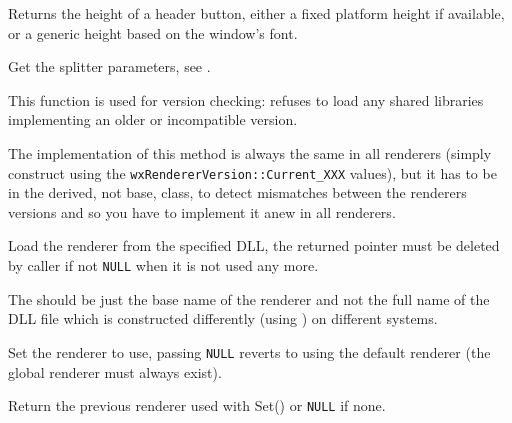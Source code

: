 \label{wxrenderernativegetheaderbuttonheight}


Returns the height of a header button, either a fixed platform height if available, or a 
generic height based on the window's font.


\label{wxrenderernativegetsplitterparams}


Get the splitter parameters, see 
.


\label{wxrenderernativegetversion}


This function is used for version checking:  
refuses to load any shared libraries implementing an older or incompatible
version.

The implementation of this method is always the same in all renderers (simply
construct  using the 
{\tt wxRendererVersion::Current\_XXX} values), but it has to be in the derived,
not base, class, to detect mismatches between the renderers versions and so you
have to implement it anew in all renderers.


\label{wxrenderernativeload}


Load the renderer from the specified DLL, the returned pointer must be
deleted by caller if not {\tt NULL} when it is not used any more.

The  should be just the base name of the renderer and not the full
name of the DLL file which is constructed differently (using 
) 
on different systems.


\label{wxrenderernativeset}


Set the renderer to use, passing {\tt NULL} reverts to using the default
renderer (the global renderer must always exist).

Return the previous renderer used with Set() or {\tt NULL} if none.

